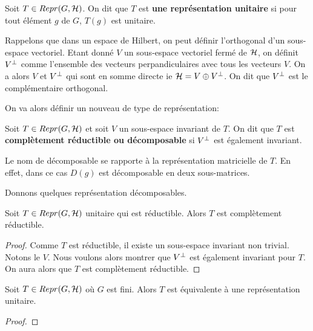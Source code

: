 \begin{definition}
	Soit $T \in Repr(G, \mathcal{H})$. On dit que $T$ est \textbf{une
	représentation unitaire} si pour tout élément $g$ de $G$, $T(g)$ est unitaire.
\end{definition}

Rappelons que dans un espace de Hilbert, on peut définir l'orthogonal d'un
sous-espace vectoriel. Etant donné $V$ un sous-espace vectoriel fermé de $\mathcal{H}$,
on définit $V^{\perp}$ comme l'ensemble des vecteurs perpandiculaires avec
tous les vecteurs $V$. On a alors $V$ et $V^{\perp}$ qui sont en somme
directe ie $\mathcal{H} = V \oplus V^{\perp}$. On dit que $V^{\perp}$ est le
complémentaire orthogonal.

On va alors définir un nouveau de type de représentation:

\begin{definition}
	Soit $T \in Repr(G, \mathcal{H})$ et soit $V$ un sous-espace invariant de
	$T$.
	On dit que $T$ est \textbf{complètement réductible ou décomposable} si
	$V^{\perp}$ est également invariant.
\end{definition}

Le nom de décomposable se rapporte à la représentation matricielle de $T$. En
effet, dans ce cas $D(g)$ est décomposable en deux sous-matrices.


Donnons quelques représentation décomposables.

\begin{proposition}
	Soit $T \in Repr(G, \mathcal{H})$ unitaire qui est réductible. Alors $T$
	est complètement réductible.
\end{proposition}

\ifdefined\outputproof
\begin{proof}
	Comme $T$ est réductible, il existe un sous-espace invariant non trivial.
	Notons le $V$.
	Nous voulons alors montrer que $V^{\perp}$ est également invariant pour
	$T$. On aura alors que $T$ est complètement réductible.
\end{proof}
\fi

\begin{proposition}
	Soit $T \in Repr(G, \mathcal{H})$ où $G$ est fini. Alors $T$ est équivalente à une
	représentation unitaire.
\end{proposition}

\ifdefined\outputproof
\begin{proof}

\end{proof}
\fi

